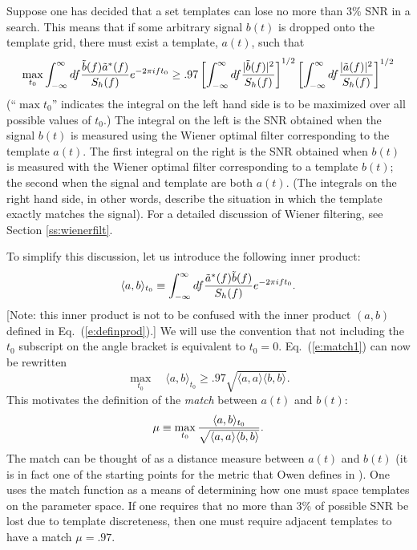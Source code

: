 Suppose one has decided that a set templates can lose no more
than $3\%$ SNR in a search.  This means that if some arbitrary
signal $b(t)$ is dropped onto the template grid, there must exist
a template, $a(t)$, such that
\begin{equation}
\label{e:match1}
\max_{t_0}\int_{-\infty}^{\infty} df {{\tilde b}(f){\tilde a}^*(f)
\over S_h(f)} e^{-2\pi ift_0} \ge 
.97 \left[\int_{-\infty}^{\infty} df
{|{\tilde b}(f)|^2\over S_h(f)}\right]^{1/2}
\left[\int_{-\infty}^{\infty} df
{|{\tilde a}(f)|^2\over S_h(f)}\right]^{1/2}
\end{equation}
(``$\max t_0$'' indicates the integral on the left hand side
is to be maximized over all possible values of $t_0$.)  The integral
on the left is the SNR obtained when the signal $b(t)$ is measured
using the Wiener optimal filter corresponding to the template $a(t)$.
The first integral on the right is the SNR obtained when $b(t)$ is
measured with the Wiener optimal filter corresponding to a template
$b(t)$; the second when the signal and template are both $a(t)$.
(The integrals on the right hand side, in other words, describe the
situation in which the template exactly matches the signal).  For
a detailed discussion of Wiener filtering, see Section
\ref{ss:wienerfilt}.

To simplify this discussion, let us introduce the following inner
product:
\begin{equation}
\label{e:definprod2}
\langle a,b\rangle_{t_0} \equiv
\int_{-\infty}^{\infty} df {{\tilde a}^*(f){\tilde b}(f)\over S_h(f)}
e^{-2\pi ift_0}.
\end{equation}
[Note: this inner product is not to be confused with the inner
product $(a,b)$ defined in Eq.~(\ref{e:definprod}).]  We will use
the convention that not including the $t_0$ subscript on the angle
bracket is equivalent to $t_0 = 0$.  Eq.~(\ref{e:match1}) can now
be rewritten
\begin{equation}
\max_{t_0}\quad\langle a,b\rangle_{t_0} \ge .97\sqrt{\langle a,a\rangle
\langle b,b\rangle}.
\end{equation}
This motivates the definition of the {\it match} between $a(t)$
and $b(t)$:
\begin{equation}
\mu \equiv \max_{t_0}{\langle a,b \rangle_{t_0}\over\sqrt{\langle a,a\rangle
\langle b,b\rangle}}.
\end{equation}
The match can be thought of as a distance measure between $a(t)$
and $b(t)$ (it is in fact one of the starting points for the metric
that Owen defines in \cite{Owen}).  One uses the match function as a
means of determining how one must space templates on the parameter space.
If one requires that no more than $3\%$ of possible SNR be lost due to
template discreteness, then one must require adjacent templates to have
a match $\mu = .97$.


